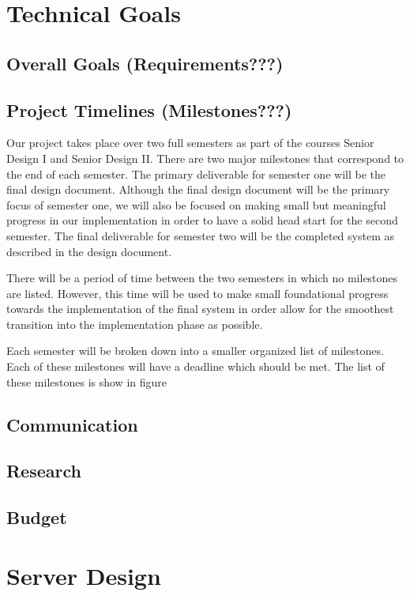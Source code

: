 \documentclass[12pt,a4paper]{report}
\begin{document}
\chapter*{Technical Goals}
	\section{Overall Goals (Requirements???)}
	\section{Project Timelines (Milestones???)}
	Our project takes place over two full semesters as part of the courses Senior Design I and Senior Design II. There are two major milestones that correspond to the end of each semester. The primary deliverable for semester one will be the final design document. Although the final design document will be the primary focus of semester one, we will also be focused on making small but meaningful progress in our implementation in order to have a solid head start for the second semester. The final deliverable for semester two will be the completed system as described in the design document. 
	
	There will be a period of time between the two semesters in which no milestones are listed. However, this time will be used to make small foundational progress towards the implementation of the final system in order allow for the smoothest transition into the implementation phase as possible. 
	
	Each semester will be broken down into a smaller organized list of milestones. Each of these milestones will have a deadline which should be met. The list of these milestones is show in figure %
	\section{Communication}
	\section{Research}
	\section{Budget}

\newpage
\chapter*{Server Design}
\end{document}
